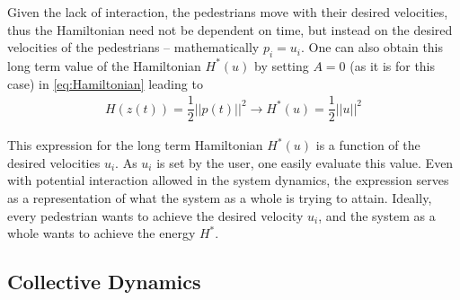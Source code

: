 \begin{itemize}
Given the lack of interaction, the pedestrians move with their desired velocities, thus the Hamiltonian need not be dependent on time, but instead on the desired velocities of the pedestrians -- mathematically $p_i = u_i$. One can also obtain this long term value of the Hamiltonian $H^*(u)$ by setting $A = 0$ (as it is for this case) in \autoref{eq:Hamiltonian} leading to 
\begin{align}
    H(z(t)) = \dfrac{1}{2}||p(t)||^2 \rightarrow H^*(u) = \dfrac{1}{2}||u||^2
    \label{eq:Hstar}
\end{align}

This expression for the long term Hamiltonian $H^*(u)$ is a function of the desired velocities $u_i$. As $u_i$ is set by the user, one easily evaluate this value. Even with potential interaction allowed in the system dynamics, the expression serves as a representation of what the system as a whole is trying to attain. Ideally, every pedestrian wants to achieve the desired velocity $u_i$, and the system as a whole wants to achieve the energy $H^*$. 
\end{itemize}

\subsection{Collective Dynamics}
\label{section:collective}

